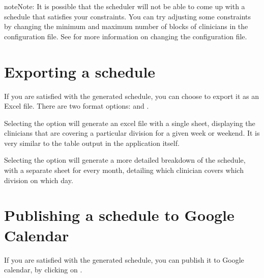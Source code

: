 \documentclass[letterpaper,10pt,english]{sphinxmanual}
\begin{document}
\begin{figure}[H]
\centering
{}\end{figure}

\begin{sphinxadmonition}{note}{Note:}
It is possible that the scheduler will not be able to come up with a
schedule that satisfies your constraints. You can try adjusting
some constraints by changing the minimum and maximum number of blocks of
clinicians in the configuration file. See {\hyperref[\detokenize{manual:clinician-configuration}]{}}
for more information on changing the configuration file.
\end{sphinxadmonition}


\section{Exporting a schedule}
\label{\detokenize{manual:exporting-a-schedule}}
If you are satisfied with the generated schedule, you can choose to export
it as an Excel file. There are two format options:  and
.

Selecting the  option will generate an excel file with a single
sheet, displaying the clinicians that are covering a particular division
for a given week or weekend. It is very similar to the table output in
the application itself.

\begin{figure}[H]
\centering
{}\end{figure}

Selecting the  option will generate a more detailed breakdown
of the schedule, with a separate sheet for every month, detailing which
clinician covers which division on which day.

\begin{figure}[H]
\centering
{}\end{figure}


\section{Publishing a schedule to Google Calendar}
\label{\detokenize{manual:publishing-a-schedule-to-google-calendar}}\label{\detokenize{manual:id4}}
If you are satisfied with the generated schedule, you can publish it
to Google calendar, by clicking on .
\end{document}
